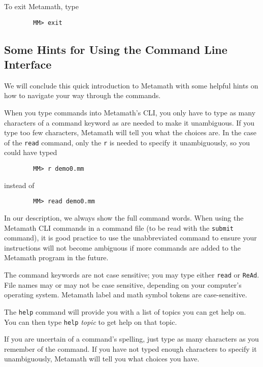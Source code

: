 To exit Metamath, type
\begin{verbatim}
        MM> exit
\end{verbatim}

\subsection{Some Hints for Using the Command Line Interface}

We will conclude this quick introduction to Metamath with some
helpful hints on how to navigate your way through the commands.

When you type commands into Metamath's CLI, you only have to type as many
characters of a command keyword as are needed to make
it unambiguous.  If you type too few characters, Metamath will tell you what
the choices are.  In the case of the \texttt{read} command, only the \texttt{r} is
needed to specify it unambiguously, so you could have typed
\begin{verbatim}
        MM> r demo0.mm
\end{verbatim}
instead of
\begin{verbatim}
        MM> read demo0.mm
\end{verbatim}
In our description, we always show the full command words.  When using the
Metamath CLI commands in a command file (to be read with the \texttt{submit}
command), it is good practice to use
the unabbreviated command to ensure your instructions will not become ambiguous
if more commands are added to the Metamath program in the future.

The command keywords are not case sensitive; you may type either \texttt{read} or
\texttt{ReAd}.  File names may or may not be case sensitive, depending on your
computer's operating system.  Metamath label and math
symbol tokens are case-sensitive.

The \texttt{help} command will provide you
with a list of topics you can get help on.  You can then type
\texttt{help} {\em topic} to get help on that topic.

If you are uncertain of a command's spelling, just type as many characters
as you remember of the command.  If you have not typed enough characters to
specify it unambiguously, Metamath will tell you what choices you have.

